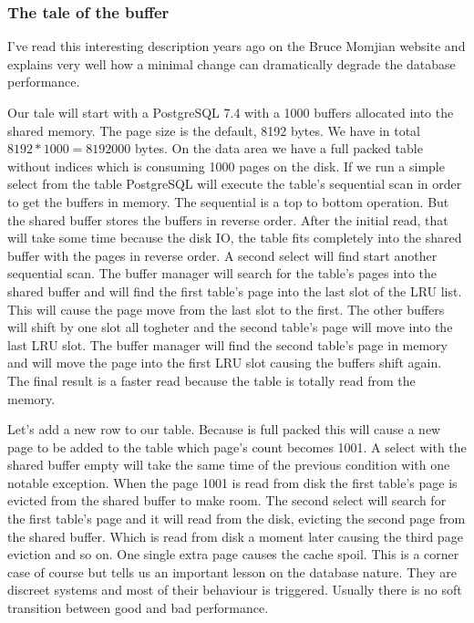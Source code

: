 \subsubsection{The tale of the buffer}
I've read this interesting description years ago on the Bruce Momjian website and explains very well how a 
minimal change can dramatically degrade the database performance.\newline

Our tale will start with a PostgreSQL 7.4 with a 1000 buffers allocated into the shared memory. The page 
size is the default, 8192 bytes. We have in total \begin{math}8192 * 1000 = 8192000\end{math} bytes. On the 
data area we have a full packed table without indices which is consuming 1000 pages on the disk. If we run 
a simple select from the table PostgreSQL  will execute the table's sequential scan in order to get the 
buffers in memory. The sequential is a top to bottom operation. But the shared buffer stores the buffers in 
reverse order. After the initial read, that will take some time because the disk IO, the table fits 
completely into the shared buffer with the pages in reverse order. A second select will find start another 
sequential scan. The buffer manager will search for the table's pages into the shared buffer and will find 
the first table's page into the last slot of the LRU list. This will cause the page move from the last slot 
to the first. The other buffers will shift by one slot all togheter and the second table's page will move 
into the last LRU slot. The buffer manager will find the second table's page in memory and will move the 
page into the first LRU slot causing the buffers shift again. The final result is a faster read because the 
table is totally read from the memory.\newline

Let's add a new row to our table. Because is full packed this will cause a new page to be added to the 
table which page's count becomes 1001. A select with the shared buffer empty will take the same time of the 
previous condition with one notable exception. When the page 1001 is read from disk the first table's page 
is evicted from the shared buffer to make room. The second select will search for the first table's page 
and it will read from the disk, evicting the second page from the shared buffer. Which is read from disk a 
moment later causing the third page eviction and so on. One single extra page causes the cache spoil. This 
is a corner case of course but tells us an important lesson on the database nature. They are discreet 
systems and most of their behaviour is triggered. Usually there is no soft transition between good and bad
performance. 


